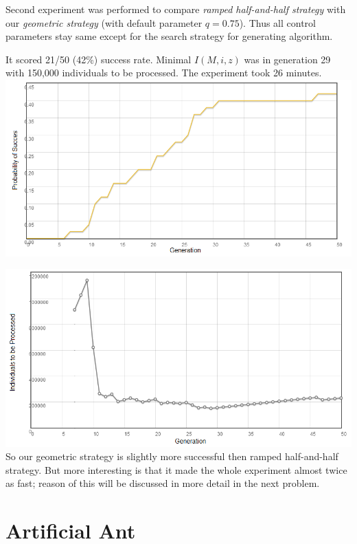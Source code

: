 \documentclass[12pt,a4paper]{report}
\begin{document}
Second experiment was performed to compare 
\textit{ramped half-and-half strategy} with our
\textit{geometric strategy} (with default parameter $q=0.75$). 
Thus all control parameters stay same except for the 
search strategy for generating algorithm.

It scored 21/50 (42\%) success rate. 
Minimal $I(M,i,z)$ was in generation 29 
with 150,000 individuals to be processed.
The experiment took 26 minutes.\\


\includegraphics[scale=0.65]{reports/SSR/2/probabs.png}

\includegraphics[scale=0.65]{reports/SSR/2/indivs.png}\\

So our geometric strategy is slightly more successful then 
ramped half-and-half strategy. But more interesting is that
it made the whole experiment almost twice as fast; 
reason of this will be discussed in more detail in the next problem. 

\newpage
\section{Artificial Ant}
\end{document}
